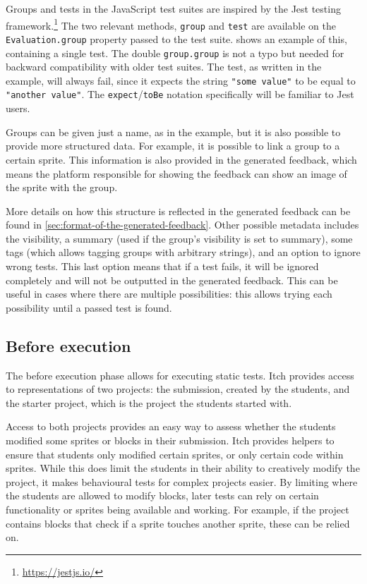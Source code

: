 \documentclass[../main]{subfiles}
\begin{document}
Groups and tests in the JavaScript test suites are inspired by the Jest testing framework.\footnote{\url{https://jestjs.io/}}
The two relevant methods, \texttt{group} and \texttt{test} are available on the \texttt{Evaluation.group} property passed to the test suite.
 shows an example of this, containing a single test.
The double \texttt{group.group} is not a typo but needed for backward compatibility with older test suites.
The test, as written in the example, will always fail, since it expects the string \texttt{"some value"} to be equal to \texttt{"another value"}.
The \texttt{expect}/\texttt{toBe} notation specifically will be familiar to Jest users.

Groups can be given just a name, as in the example, but it is also possible to provide more structured data.
For example, it is possible to link a group to a certain sprite.
This information is also provided in the generated feedback, which means the platform responsible for showing the feedback can show an image of the sprite with the group.

More details on how this structure is reflected in the generated feedback can be found in \cref{sec:format-of-the-generated-feedback}.
Other possible metadata includes the visibility, a summary (used if the group's visibility is set to summary), some tags (which allows tagging groups with arbitrary strings), and an option to ignore wrong tests.
This last option means that if a test fails, it will be ignored completely and will not be outputted in the generated feedback.
This can be useful in cases where there are multiple possibilities: this allows trying each possibility until a passed test is found.

\subsection{Before execution}\label{subsec:before-execution}

The before execution phase allows for executing static tests.
Itch provides access to representations of two projects: the submission, created by the students, and the starter project, which is the project the students started with.

Access to both projects provides an easy way to assess whether the students modified some sprites or blocks in their submission.
Itch provides helpers to ensure that students only modified certain sprites, or only certain code within sprites.
While this does limit the students in their ability to creatively modify the project, it makes behavioural tests for complex projects easier.
By limiting where the students are allowed to modify blocks, later tests can rely on certain functionality or sprites being available and working.
For example, if the project contains blocks that check if a sprite touches another sprite, these can be relied on.
\end{document}
